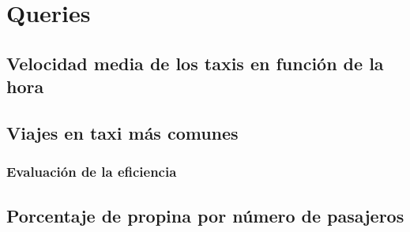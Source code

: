 \section{Queries}


\subsection{Velocidad media de los taxis en función de la hora}



\subsection{Viajes en taxi más comunes}


\subsubsection*{Evaluación de la eficiencia}



\subsection{Porcentaje de propina por número de pasajeros}

